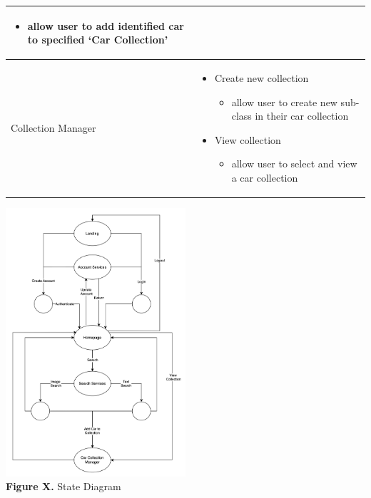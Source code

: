 \documentclass[]{article}
\begin{document}
\begin{tabular}{|p{3cm}|p{13cm}|}
\begin{itemize} [left=2pt]
\begin{itemize}
			\item allow user to add identified car to specified ‘Car Collection’
		\end{itemize}
	\end{itemize} \\
	\hline
	Collection Manager &
	\begin{itemize} [left=2pt]
		\item Create new collection
		\begin{itemize}
			\item allow user to create new sub-class in their car collection
		\end{itemize}
		\item View collection
		\begin{itemize}
			\item allow user to select and view a car collection
		\end{itemize}
	\end{itemize} \\
	\hline
\end{tabular}

\begin{center}
	\includegraphics[width=0.5\textwidth]{images/state_diagram.png} \\
	\textbf{Figure X. } State Diagram
\end{center}
\end{document}

